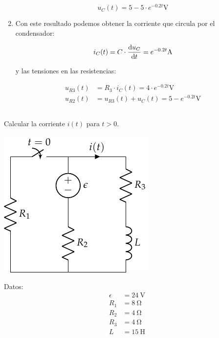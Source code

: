\documentclass[12pt]{article}
\begin{document}
\begin{enumerate}
\begin{equation*}
  u_C(t) = 5 - 5 \cdot e^{-0.2t} \unit{\volt}
\end{equation*}

\item Con este resultado podemos obtener la corriente que circula por
  el condensador:

\begin{equation*}
  i_C(t) = C \cdot \diff{u_C}{t} = e^{-0.2t} \unit{\ampere}
\end{equation*}

y las tensiones en las resistencias:

\begin{align*}
  u_{R3}(t) &=  R_3 \cdot i_C(t) = 4 \cdot e^{-0.2t} \unit{\volt}\\
  u_{R2}(t) &=  u_{R3}(t) + u_C(t) = 5 - e^{-0.2t} \unit{\volt}
\end{align*}
  


  
  
\end{enumerate}

\clearpage

\subsection{}

Calcular la corriente $i(t)$ para $t > 0$. 

\begin{minipage}{0.5\textwidth}
\includegraphics{figs/FM_4_2}
\end{minipage}
\hfill
\begin{minipage}{0.5\textwidth}
Datos:
\begin{align*}
  \epsilon &= \SI{24}{\volt}\\
  R_1 &= \SI{8}{\ohm}\\
  R_2 &= \SI{4}{\ohm}\\
  R_3 &= \SI{4}{\ohm}\\
  L &= \SI{15}{\henry}
\end{align*}
\end{minipage}
\end{document}
